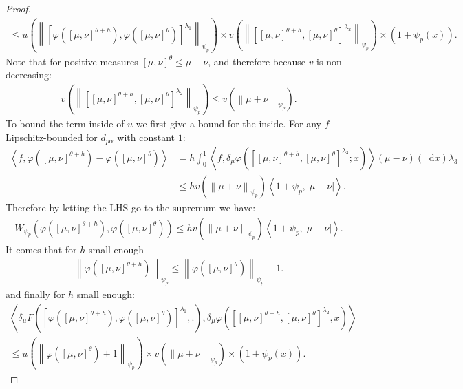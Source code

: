 \documentclass[11pt,a4paper]{article}
\newcommand{\brac}[1]{\left\langle#1\right\rangle}
\newcommand{\dd}{\mathop{}\!\mathrm{d}}
\begin{document}
\begin{proof}
\begin{multline*}
        \leq u\left(\left\|\left[\varphi\left([\mu,\nu]^{\theta + h}\right),\varphi\left([\mu,\nu]^{\theta}\right)\right]^{\lambda_1} \right\|_{\psi_p}\right)\times v\left(\left\|\left[ [\mu,\nu]^{\theta + h}, [\mu,\nu]^{\theta }\right]^{\lambda_2} \right\|_{\psi_p}\right)\times  ( 1 + \psi_p(x)).
    \end{multline*}
    Note that for positive measures $\left[\mu,\nu \right]^\theta \leq \mu + \nu$, and therefore because $v$ is non-decreasing:
    \begin{align*}
        v\left(\left\|\left[ [\mu,\nu]^{\theta + h}, [\mu,\nu]^{\theta }\right]^{\lambda_2} \right\|_{\psi_p}\right) \leq v\left(\left\|\mu + \nu\right\|_{\psi_p}\right).
    \end{align*}
    To bound the term inside of $u$ we first give a bound for the inside. For any $f$ Lipschitz-bounded for $d_{p\alpha}$ with constant $1$:
    \begin{align*}
        \brac{f,\varphi\left([\mu,\nu]^{\theta + h}\right)- \varphi\left([\mu,\nu]^{\theta}\right)}
        &= h\int_0^1 \brac{f, \delta_\mu \varphi \left(\left[ [\mu,\nu]^{\theta + h}, [\mu,\nu]^{\theta }\right]^{\lambda_3};x \right)} (\mu - \nu)(\dd x) \lambda_3\\
        &\leq h v\left(\left\|\mu + \nu\right\|_{\psi_p}\right) \brac{1 + \psi_p, |\mu - \nu|}.
    \end{align*}
    Therefore by letting the LHS go to the supremum we have:
    \begin{align*}
        W_{\psi_p}\left(\varphi\left([\mu,\nu]^{\theta + h}\right), \varphi\left([\mu,\nu]^{\theta}\right) \right) \leq h v\left(\left\|\mu + \nu\right\|_{\psi_p}\right) \brac{1 + \psi_p, |\mu - \nu|}.
    \end{align*}
    It comes that for $h$ small enough 
    \begin{align*}
        \left\|\varphi\left([\mu,\nu]^{\theta + h}\right)\right\|_{\psi_p} \leq  \left\|\varphi\left([\mu,\nu]^{\theta }\right)\right\|_{\psi_p} + 1.
    \end{align*}
    and finally for $h$ small enough:
    \begin{multline*}
        \brac{\delta_\mu F\left(\left[\varphi\left([\mu,\nu]^{\theta + h}\right),\varphi\left([\mu,\nu]^{\theta}\right)\right]^{\lambda_1}, . \right),\delta_\mu \varphi\left(\left[ [\mu,\nu]^{\theta + h}, [\mu,\nu]^{\theta }\right]^{\lambda_2} ,x\right)} \\
        \leq u\left(\left\|\varphi\left([\mu,\nu]^{\theta }\right)+ 1\right\|_{\psi_p}\right)\times v\left(\left\|\mu + \nu\right\|_{\psi_p}\right)\times  ( 1 + \psi_p(x)).

\end{multline*}
\end{proof}
\end{document}
